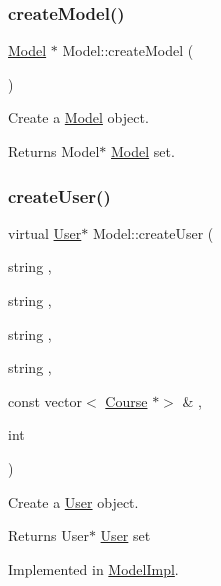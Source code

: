 \subsubsection{\texorpdfstring{create\+Model()}{createModel()}}
{\footnotesize\ttfamily \hyperlink{classModel}{Model} $\ast$ Model\+::create\+Model (\begin{DoxyParamCaption}{ }\end{DoxyParamCaption})\hspace{0.3cm}{\ttfamily [static]}}



Create a \hyperlink{classModel}{Model} object. 

\begin{DoxyReturn}{Returns}
Model$\ast$ \hyperlink{classModel}{Model} set. 
\end{DoxyReturn}
\mbox{\label{classModel_a8080158d8cd5ff74bb0daae3824c220b}} 
\subsubsection{\texorpdfstring{create\+User()}{createUser()}}
{\footnotesize\ttfamily virtual \hyperlink{classUser}{User}$\ast$ Model\+::create\+User (\begin{DoxyParamCaption}\item[{string}]{,  }\item[{string}]{,  }\item[{string}]{,  }\item[{string}]{,  }\item[{const vector$<$ \hyperlink{classCourse}{Course} $\ast$$>$ \&}]{,  }\item[{int}]{ }\end{DoxyParamCaption})\hspace{0.3cm}{\ttfamily [pure virtual]}}



Create a \hyperlink{classUser}{User} object. 

\begin{DoxyReturn}{Returns}
User$\ast$ \hyperlink{classUser}{User} set 
\end{DoxyReturn}


Implemented in \hyperlink{classModelImpl_affad955ee2bdbfc58ac049632cd9668b}{Model\+Impl}.

\mbox{\label{classModel_aded51911782e4fa19a79a423482dc561}} 

